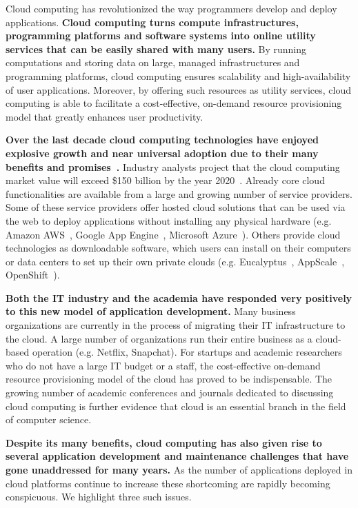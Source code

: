 Cloud computing has revolutionized the way programmers develop and deploy applications.
\textbf{Cloud computing turns compute infrastructures, programming platforms and software systems
into online utility services that can be easily shared with many users.}
By running computations and storing data on large, managed infrastructures and 
programming platforms, cloud computing ensures scalability and high-availability of 
user applications. Moreover, by offering such resources
as utility services, cloud computing is able to facilitate a cost-effective, on-demand
resource provisioning model that greatly enhances user productivity.

\textbf{Over the last decade cloud computing technologies have enjoyed explosive growth 
and near universal adoption due to their many benefits and 
promises~\cite{Antonopoulos:2010:CCP:1855007,Pinheiro:2014:ACC:2618168.2618188}.} 
Industry analysts project that the cloud computing market value will exceed \$150 billion
by the year 2020~\cite{cloud-growth}.
Already core cloud 
functionalities are available from a large and growing number of service providers. 
Some of these service providers offer hosted cloud solutions that can be used
via the web to deploy applications without installing any physical hardware 
(e.g. Amazon AWS~\cite{amazon-aws-web}, Google App Engine~\cite{gae}, Microsoft Azure~\cite{azure-web}). Others
provide cloud technologies as downloadable software, which users can install
on their computers or data centers to set up their own private clouds 
(e.g. Eucalyptus~\cite{eucalyptus09}, AppScale~\cite{6488671}, OpenShift~\cite{openshift}). 

\textbf{Both the IT industry and the academia have responded very positively to this new 
model of application 
development.} Many business organizations are currently in the process of migrating
their IT infrastructure to the cloud. A large number of organizations
run their entire business as a cloud-based operation (e.g. Netflix, Snapchat). For startups
and academic researchers who do not have a large IT budget or a staff, the cost-effective 
on-demand resource provisioning model of the cloud has proved to be indispensable.
The growing number of academic conferences and journals dedicated to discussing
cloud computing is further evidence that cloud is an essential branch in the field
of computer science.

\textbf{Despite its many benefits, cloud computing has also given rise to several application
development and maintenance challenges that have gone unaddressed for many years.}
As the number of applications deployed in cloud platforms continue to increase these
shortcoming are rapidly becoming conspicuous. We highlight three such issues.
 
